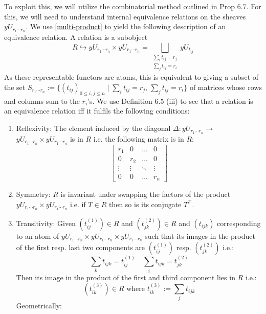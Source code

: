 \documentclass[a4paper]{amsproc}
\theoremstyle{plain}
\theoremstyle{definition}
\theoremstyle{remark}
\numberwithin{equation}{section}
\begin{document}
To exploit this, we will utilize the combinatorial method outlined in \cite{caramello_lafforgue} Prop 6.7. For this, we will need to understand internal equivalence relations on the sheaves $yU_{r_1\cdots r_n}$. We use \ref{multi-product} to yield the following description of an equivalence relation. \newline
\indent A relation is a subobject
\[R\hookrightarrow yU_{r_1\cdots r_n}\times yU_{r_1\cdots r_n}=\bigsqcup_{\substack{\sum_i t_{ij}=r_j \\ \sum_j t_{ij}=r_i}  }yU_{t_{ij}}\]
As these representable functors are atoms, this is equivalent to giving a subset of the set $S_{r_1\cdots r_n}:=\{(t_{ij})_{0\leq i,j \leq n} \mid \sum_i t_{ij}=r_j,\, \sum_j t_{ij}=r_i \}$ of matrices whose rows and columns sum to the $r_i$'s. We use Definition 6.5 (iii) \cite{caramello_lafforgue} to see that a relation is an equivalence relation iff it fulfils the following conditions:
\begin{enumerate}
\item Reflexivity:  The element induced by the diagonal $\Delta: yU_{r_1\cdots r_n}\rightarrow $\linebreak $ yU_{r_1\cdots r_n}\times yU_{r_1\cdots r_n}$ is in $R$ i.e. the following matrix is in $R$:
\[ \begin{bmatrix}
    r_{1}       & 0 & \dots & 0 \\
    0      & r_2 &  \dots &0 \\
    \vdots & \vdots &  \ddots& \vdots\\
    0       & 0& \dots & r_n
\end{bmatrix} \]
\item Symmetry: $R$ is invariant under swapping the factors of the product $ yU_{r_1\cdots r_n}\times yU_{r_1\cdots r_n}$ i.e. if $T\in R$ then so is its conjugate $T^\top$.
\item Transitivity: Given $(t^{(1)}_{ij})\in R$ and $(t^{(2)}_{jk})\in R$ and $(t_{ijk})$ corresponding to an atom of $yU_{r_1\cdots r_n}\times yU_{r_1\cdots r_n} \times yU_{r_1\cdots r_n}$ such that its images in the product of the first resp. last two components are $(t^{(1)}_{ij})$ resp. $(t^{(2)}_{jk})$ i.e.:
\[\sum_k t_{ijk}=t^{(1)}_{ij} \quad \sum_i t_{ijk}=t^{(2)}_{jk} \]
Then its image in the product of the first and third component lies in $R$ i.e.:
\[(t^{(3)}_{ik})\in R \text{ where }t^{(3)}_{ik}:=\sum_j t_{ijk}    \]
Geometrically:
\end{enumerate}
\end{document}
